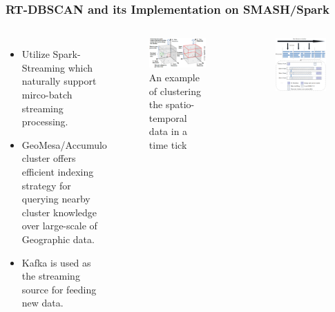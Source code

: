 \begin{frame}
    \frametitle{RT-DBSCAN and its Implementation on SMASH/Spark}
    \begin{columns}
            \begin{itemize}
                \item \tiny Utilize Spark-Streaming which naturally support mirco-batch streaming processing.
                \item \tiny GeoMesa/Accumulo cluster offers efficient indexing strategy for querying nearby cluster knowledge over large-scale of Geographic data.
                \item \tiny Kafka is used as the streaming source for feeding new data.
            \end{itemize}
            \begin{figure}
                \centering
                \includegraphics[width=\linewidth]{resource/figures/nearby-3d.png}
                \caption{\small An example of clustering the spatio-temporal data in a time tick}
            \end{figure}
        \begin{figure}
            \centering
            \includegraphics[width=\linewidth]{resource/figures/RT-DBSCAN_Spark.png}

\end{figure}
\end{columns}
\end{frame}
